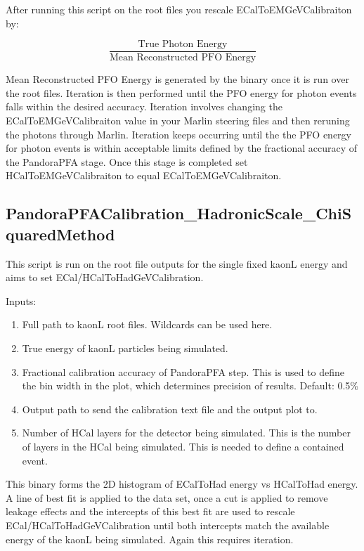 \documentclass[11pt, oneside]{article}   	%
\begin{document}
After running this script on the root files you rescale ECalToEMGeVCalibraiton by:

\begin{equation}
\frac{\text{True Photon Energy}}{\text{Mean Reconstructed PFO Energy}}
\end{equation}

Mean Reconstructed PFO Energy is generated by the binary once it is run over the root files.  Iteration is then performed until the PFO energy for photon events falls within the desired accuracy.  Iteration involves changing the ECalToEMGeVCalibraiton value in your Marlin steering files and then reruning the photons through Marlin.  Iteration keeps occurring until the the PFO energy for photon events is within acceptable limits defined by the fractional accuracy of the PandoraPFA stage.  Once this stage is completed set HCalToEMGeVCalibraiton to equal ECalToEMGeVCalibraiton.

\subsection{PandoraPFACalibration\_HadronicScale\_ChiSquaredMethod}

This script is run on the root file outputs for the single fixed kaonL energy and aims to set ECal/HCalToHadGeVCalibration.

Inputs:
\begin{enumerate}
\item Full path to kaonL root files.  Wildcards can be used here.
\item True energy of kaonL particles being simulated.
\item Fractional calibration accuracy of PandoraPFA step.  This is used to define the bin width in the plot, which determines precision of results.  Default: 0.5\%
\item Output path to send the calibration text file and the output plot to.
\item Number of HCal layers for the detector being simulated.  This is the number of layers in the HCal being simulated.  This is needed to define a contained event.
\end{enumerate}

This binary forms the 2D histogram of ECalToHad energy vs HCalToHad energy.  A line of best fit is applied to the data set, once a cut is applied to remove leakage effects and the intercepts of this best fit are used to rescale ECal/HCalToHadGeVCalibration until both intercepts match the available energy of the kaonL being simulated.  Again this requires iteration.
\end{document}
